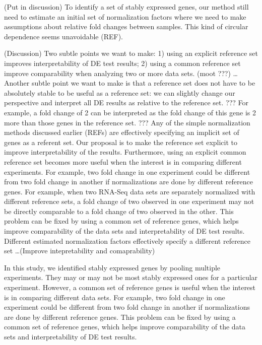 \documentclass[11pt, a4paper]{article}
\begin{document}
(Put in discussion) To identify a set of stably expressed genes, our method
still need to estimate an initial set of normalization factors where we need
to make assumptions about relative fold changes between samples. This kind of
circular dependence seems unavoidable (REF). 

(Discussion) Two subtle points we want to make: 1) using an explicit reference
set improves interpretability of DE test results; 2) using a common reference
set improve comparability when analyzing two or more data sets. (moot ???)
\dots Another subtle point we want to make is that a reference set does not
have to be absolutely stable to be useful as a reference set: we can slightly
change our perspective and interpret all DE results as relative to the
reference set.  ??? For example, a fold change of 2 can be interpreted as the
fold change of this gene is 2 more than those genes in the reference set. ???
Any of the simple normalization methods discussed earlier (REFs) are
effectively specifying an implicit set of genes as a referent set. Our
proposal is to make the reference set explicit to improve interpretability of
the results.  Furthermore, using an explicit common reference set becomes more
useful when the interest is in comparing different experiments.  For example,
two fold change in one experiment could be different from two fold change in
another if normalizations are done by different reference genes.  For example,
when two RNA-Seq data sets are separately normalized with different reference
sets, a fold change of two observed in one experiment may not be directly
comparable to a fold change of two observed in the other.  This problem can be
fixed by using a common set of reference genes, which helps improve
comparability of the data sets and interpretability of DE test results.
Different estimated normalization factors effectively specify a different
reference set \ldots (Improve intepretability and comaprability)

In this study, we identified stably expressed genes by pooling multiple
experiments. They may or may not be most stably expressed ones for a
particular experiment. However, a common set of reference genes is useful when
the interest is in comparing different data sets. For example, two fold change
in one experiment could be different from two fold change in another if
normalizations are done by different reference genes. This problem can be
fixed by using a common set of reference genes, which helps improve
comparability of the data sets and interpretability of DE test results.  
\end{document}
